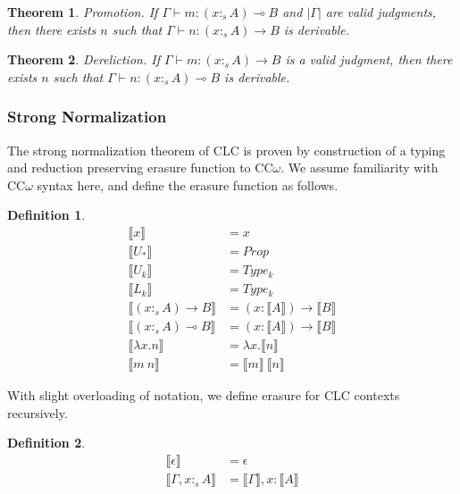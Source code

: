 \documentclass[sigplan,screen]{acmart}
\newtheorem{theorem}{Theorem}[section]
\theoremstyle{definition}
\newtheorem{definition}{Definition}[section]
\newcommand{\pure}[1]{|#1|}
\newcommand{\stype}[1]{:_#1}
\newcommand{\erase}[1]{\llbracket #1 \rrbracket}
\begin{document}
  \begin{theorem} 
    Promotion. If $\Gamma \vdash m : (x \stype{s} A) \multimap B$ and $\pure{\Gamma}$ are valid judgments, then there exists $n$ such that $\Gamma \vdash n : (x \stype{s} A) \rightarrow B$ is derivable.
  \end{theorem}

  \begin{theorem} 
    Dereliction. If $\Gamma \vdash m : (x \stype{s} A) \rightarrow B$ is a valid judgment, then there exists $n$ such that $\Gamma \vdash n : (x \stype{s} A) \multimap B$ is derivable.
  \end{theorem}

  \subsubsection{Strong Normalization}
  The strong normalization theorem of CLC is proven by construction of a typing and reduction preserving erasure function to CC$\omega$. We assume familiarity with CC$\omega$ syntax here, and define the erasure function as follows.

  \begin{definition}
    \begin{align*}
      \erase{x} &= x \\
      \erase{U_*} &= Prop \\
      \erase{U_k} &= Type_k \\
      \erase{L_k} &= Type_k \\
      \erase{(x \stype{s} A) \rightarrow B} &= (x : \erase{A}) \rightarrow \erase{B} \\
      \erase{(x \stype{s} A) \multimap B} &= (x : \erase{A}) \rightarrow \erase{B} \\
      \erase{\lambda x.n} &= \lambda x.\erase{n} \\
      \erase{m\ n} &= \erase{m}\ \erase{n}
    \end{align*}
  \end{definition}

  With slight overloading of notation, we define erasure for CLC contexts recursively.

  \begin{definition}
    \begin{align*}
      \erase{\epsilon} &= \epsilon \\
      \erase{\Gamma, x \stype{s} A} &= \erase{\Gamma}, x : \erase{A}
    \end{align*}
  \end{definition}
\end{document}
